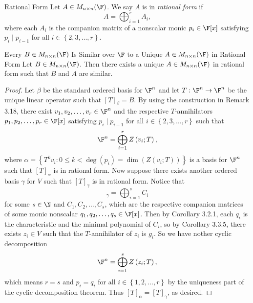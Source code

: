 \documentclass[linearalgebraII]{subfiles}
\begin{document}
    \begin{definition}{Rational Form}{}
        Let $A\in M_{n\times n}(\F)$. We say $A$ is in \emph{rational form} if
        \begin{equation*}
            A = \bigoplus^{r}_{i=1} A_i,
        \end{equation*}
        where each $A_i$ is the companion matrix of a nonscalar monic $p_i\in\F[x]$ satisfying $p_i\mid p_{i-1}$ for all $i\in\left\lbrace 2,3,\ldots,r \right\rbrace $.
    \end{definition}

    \begin{theorem}{Every $B\in M_{n\times n}(\F)$ Is Similar over $\F$ to a Unique $A\in M_{n\times n}(\F)$ in Rational Form}
        Let $B\in M_{n\times n}(\F)$. Then there exists a unique $A\in M_{n\times n}(\F)$ in rational form such that $B$ and $A$ are similar.
    \end{theorem}

    \begin{proof}
        Let $\beta$ be the standard ordered basis for $\F^n$ and let $T:\F^n\to\F^n$ be the unique linear operator such that $[T]_\beta = B$. By using the construction in Remark 3.18, there exist $v_1,v_2,\ldots,v_r\in\F^n$ and the respective $T$-annihilators $p_1,p_2,\ldots,p_r\in\F[x]$ satisfying $p_i\mid p_{i-1}$ for all $i\in \left\lbrace 2,3,\ldots,r \right\rbrace$ such that
        \begin{equation*}
            \F^n = \bigoplus^{r}_{i=1} Z\left( v_i;T \right) ,
        \end{equation*}
        where $\alpha = \left\lbrace T^kv_i:0\leq k< \deg\left( p_i \right) = \dim\left( Z\left( v_i;T \right)  \right)  \right\rbrace$ is a basis for $\F^n$ such that $[T]_\alpha$ is in rational form. Now suppose there exists another ordered basis $\gamma$ for $V$ such that $[T]_\gamma$ is in rational form. Notice that
        \begin{equation*}
            [T]_\gamma = \bigoplus^{s}_{i=1} C_i
        \end{equation*}
        for some $s\in\N$ and $C_1,C_2, \ldots, C_s$, which are the respective companion matrices of some monic nonscalar $q_1,q_2,\ldots,q_s\in\F[x]$. Then by Corollary 3.2.1, each $q_i$ is the characteristic and the minimal polynomial of $C_i$, so by Corollary 3.3.5, there exists $z_i\in V$ such that the $T$-annihilator of $z_i$ is $g_i$. So we have nother cyclic decomposition
        \begin{equation*}
            \F^n = \bigoplus^{s}_{i=1} Z\left( z_i;T \right) ,
        \end{equation*}
        which means $r=s$ and $p_i=q_i$ for all $i\in \left\lbrace 1,2,\ldots,r \right\rbrace$ by the uniqueness part of the cyclic decomposition theorem. Thus $[T]_\alpha = [T]_\gamma$, as desired.
    \end{proof}
\end{document}
